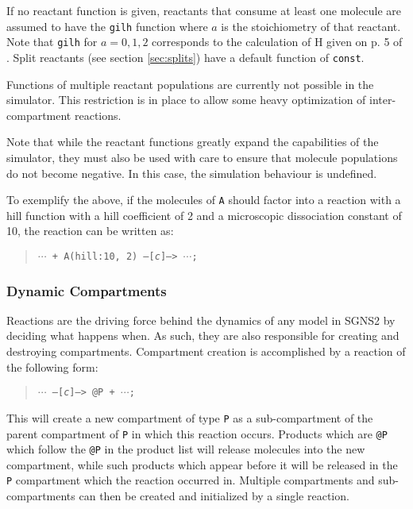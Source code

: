 \documentclass[10pt]{article}
\newcommand{\code}[1]{{\tt {#1}}}
\newcommand{\codeparam}[1]{\textrm{\textit{#1}}}
\newcommand{\programname}{SGNS2}
\begin{document}
If no reactant function is given, reactants that consume at least one molecule are assumed to have the \code{gilh} function where $a$ is the stoichiometry of that reactant. Note that \code{gilh} for $a = 0, 1, 2$ corresponds to the calculation of H given on p. 5 of \cite{Gillespie1977}. Split reactants (see section \ref{sec:splits}) have a default function of \code{const}.

Functions of multiple reactant populations are currently not possible in the simulator. This restriction is in place to allow some heavy optimization of inter-compartment reactions.

Note that while the reactant functions greatly expand the capabilities of the simulator, they must also be used with care to ensure that molecule populations do not become negative. In this case, the simulation behaviour is undefined.

To exemplify the above, if the molecules of \code{A} should factor into a reaction with a hill function with a hill coefficient of 2 and a microscopic dissociation constant of 10, the reaction can be written as:

\begin{quote}
\code{$\cdots$ + A(hill:10, 2) --[\codeparam{c}]--> $\cdots$;}
\end{quote}

\subsubsection{Dynamic Compartments}
\label{sec:dyn-compartments}

Reactions are the driving force behind the dynamics of any model in {\programname} by deciding what happens when. As such, they are also responsible for creating and destroying compartments. Compartment creation is accomplished by a reaction of the following form:

\begin{quote}
\code{$\cdots$ --[\codeparam{c}]--> @P + $\cdots$;}
\end{quote}

This will create a new compartment of type \code{P} as a sub-compartment of the parent compartment of \code{P} in which this reaction occurs. Products which are \code{@P} which follow the \code{@P} in the product list will release molecules into the new compartment, while such products which appear before it will be released in the \code{P} compartment which the reaction occurred in. Multiple compartments and sub-compartments can then be created and initialized by a single reaction.
\end{document}
